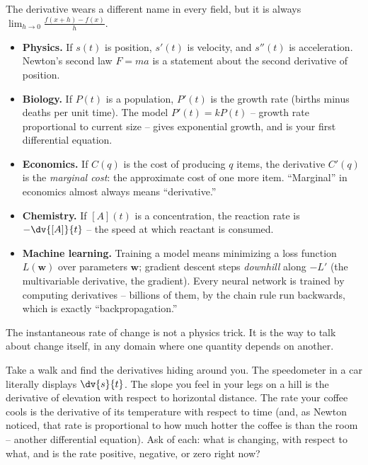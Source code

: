 \begin{applicationbox}
The derivative wears a different name in every field, but it is always
$\displaystyle\lim_{h\to 0}\frac{f(x+h)-f(x)}{h}$.
\begin{itemize}
  \item \textbf{Physics.} If $s(t)$ is position, $s'(t)$ is velocity, and
  $s''(t)$ is acceleration. Newton's second law $F = ma$ is a statement about the
  second derivative of position.
  \item \textbf{Biology.} If $P(t)$ is a population, $P'(t)$ is the growth rate
  (births minus deaths per unit time). The model $P'(t) = kP(t)$ -- growth rate
  proportional to current size -- gives exponential growth, and is your first
  differential equation.
  \item \textbf{Economics.} If $C(q)$ is the cost of producing $q$ items, the
  derivative $C'(q)$ is the \emph{marginal cost}: the approximate cost of one more
  item. ``Marginal'' in economics almost always means ``derivative.''
  \item \textbf{Chemistry.} If $[A](t)$ is a concentration, the reaction rate is
  $-\dv{[A]}{t}$ -- the speed at which reactant is consumed.
  \item \textbf{Machine learning.} Training a model means minimizing a loss
  function $L(\mathbf{w})$ over parameters $\mathbf{w}$; gradient descent steps
  \emph{downhill} along $-L'$ (the multivariable derivative, the gradient). Every
  neural network is trained by computing derivatives -- billions of them, by the
  chain rule run backwards, which is exactly ``backpropagation.''
\end{itemize}
The instantaneous rate of change is not a physics trick. It is the way to talk
about change itself, in any domain where one quantity depends on another.
\end{applicationbox}

\begin{walkbox}
Take a walk and find the derivatives hiding around you. The speedometer in a car
literally displays $\dv{s}{t}$. The slope you feel in your legs on a hill is the
derivative of elevation with respect to horizontal distance. The rate your coffee
cools is the derivative of its temperature with respect to time (and, as Newton
noticed, that rate is proportional to how much hotter the coffee is than the room
-- another differential equation). Ask of each: what is changing, with respect to
what, and is the rate positive, negative, or zero right now?
\end{walkbox}

